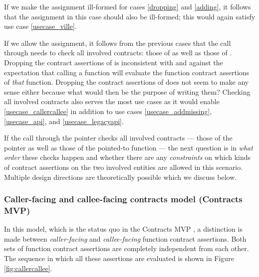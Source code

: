 If we make the assignment ill-formed for cases \ref{dropping} and \ref{adding}, it follows that the assignment in this case should also be ill-formed; this would again satisfy use case \ref{usecase_ville}.

If we allow the assignment, it follows from the previous cases that the call through  needs to check all involved contracts: those of  as well as those of . Dropping the contract assertions of  is inconsistent with \cite{P2900R8} and against the expectation that calling a function will evaluate the function contract assertions of \emph{that} function. Dropping the contract assertions of  does not seem to make any sense either because what would then be the purpose of writing them? Checking all involved contracts also serves the most use cases as it would enable \ref{usecase_callercallee} in addition to use cases \ref{usecase_addmissing}, \ref{usecase_api}, and \ref{usecase_legacyapi}.

If the call through the pointer checks all involved contracts --- those of the pointer as well as those of the pointed-to function --- the next question is in \emph{what order} these checks happen and whether there are any \emph{constraints} on which kinds of contract assertions on the two involved entities are allowed in this scenario. Multiple design directions are theoretically possible which we discuss below.


\subsubsection{Caller-facing and callee-facing contracts model (Contracts MVP)}

In this model, which is the status quo in the Contracts MVP \cite{P2900R8}, a distinction is made between \emph{caller-facing} and \emph{callee-facing} function contract assertions. Both sets of function contract assertions are completely independent from each other. The sequence in which all these assertions are evaluated is shown in Figure \ref{fig:callercallee}.

